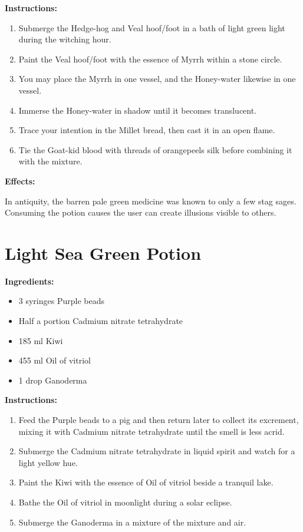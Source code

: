 \documentclass{article}
\begin{document}
\textbf{Instructions:}

\begin{enumerate}
  \item Submerge the Hedge-hog and Veal hoof/foot in a bath of light green light during the witching hour.
  \item Paint the Veal hoof/foot with the essence of Myrrh within a stone circle.
  \item You may place the Myrrh in one vessel, and the Honey-water likewise in one vessel.
  \item Immerse the Honey-water in shadow until it becomes translucent.
  \item Trace your intention in the Millet bread, then cast it in an open flame.
  \item Tie the Goat-kid blood with threads of orangepeels silk before combining it with the mixture.
\end{enumerate}

\textbf{Effects:}

In antiquity, the barren pale green medicine was known to only a few stag sages. Consuming the potion causes the user can create illusions visible to others.

\newpage
\section*{Light Sea Green Potion}

\textbf{Ingredients:}

\begin{itemize}
  \item 3 syringes Purple beads
  \item Half a portion Cadmium nitrate tetrahydrate
  \item 185 ml Kiwi
  \item 455 ml Oil of vitriol
  \item 1 drop Ganoderma
\end{itemize}

\textbf{Instructions:}

\begin{enumerate}
  \item Feed the Purple beads to a pig and then return later to collect its excrement, mixing it with Cadmium nitrate tetrahydrate until the smell is less acrid.
  \item Submerge the Cadmium nitrate tetrahydrate in liquid spirit and watch for a light yellow hue.
  \item Paint the Kiwi with the essence of Oil of vitriol beside a tranquil lake.
  \item Bathe the Oil of vitriol in moonlight during a solar eclipse.
  \item Submerge the Ganoderma in a mixture of the mixture and air.
\end{enumerate}
\end{document}
